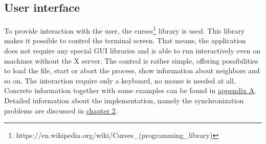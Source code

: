 \subsection{User interface}\label{user-interface}

To provide interaction with the user, the
curses\footnote{https://en.wikipedia.org/wiki/Curses\_(programming\_library)}
library is used. This library makes it possible to control the terminal
screen. That means, the application does not require any special GUI
libraries and is able to run interactively even on machines without the
X server. The control is rather simple, offering possibilities to load
the file, start or abort the process, show information about neighbors
and so on. The interaction require only a keyboard, no mouse is needed
at all. Concrete information together with some examples can be found in
\hyperref[installation-and-use]{appendix A}. Detailed information about
the implementation, namely the synchronization problems are discussed in
\hyperref[implementation]{chapter 2}.
